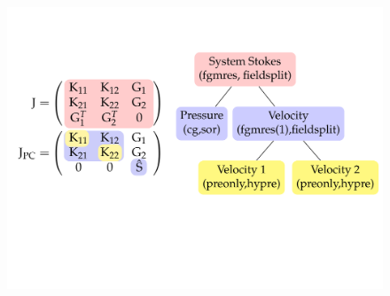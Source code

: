 \begin{figure}[h!]
  \centering 
\includegraphics[width=.8\textwidth]{figures/Stokes_block_preconditioners.pdf}

\end{figure}
